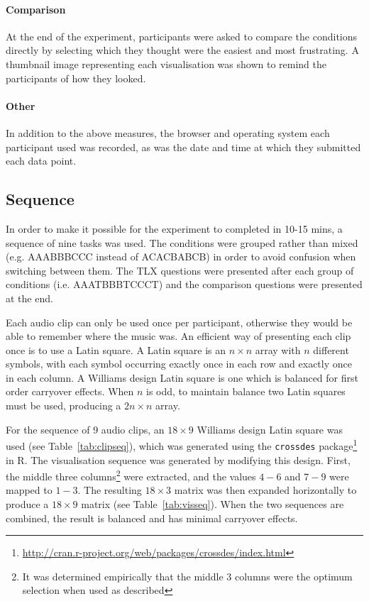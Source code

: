 \paragraph{Comparison}
At the end of the experiment, participants were asked to compare the conditions
directly by selecting which they thought were the easiest and most frustrating.
A thumbnail image representing each visualisation was shown to remind the
participants of how they looked.

\paragraph{Other}
In addition to the above measures, the browser and operating system each
participant used was recorded, as was the date and time at which they
submitted each data point.

\subsection{Sequence}\label{sec:studysequence}
In order to make it possible for the experiment to completed in 10-15 mins, a
sequence of nine tasks was used. The conditions were grouped rather than mixed
(e.g. AAABBBCCC instead of ACACBABCB) in order to avoid confusion when
switching between them. The TLX questions were presented after each group of
conditions (i.e. AAATBBBTCCCT) and the comparison questions were presented at
the end.

Each audio clip can only be used once per participant, otherwise they would be
able to remember where the music was. An efficient way of presenting each clip
once is to use a Latin square. A Latin square is an $n \times n$ array with $n$
different symbols, with each symbol occurring exactly once in each row and
exactly once in each column. A Williams design Latin square \citep{Williams1949}
is one which is balanced for first order carryover effects.  When $n$ is odd,
to maintain balance two Latin squares must be used, producing a $2n \times n$
array.

For the sequence of 9 audio clips, an $18\times9$ Williams design Latin square
was used (see Table~\ref{tab:clipseq}), which was generated using the
\texttt{crossdes}
package\footnote{\url{http://cran.r-project.org/web/packages/crossdes/index.html}}
in R. The visualisation sequence was generated by modifying this design. First,
the middle three columns\footnote{It was determined empirically that the
  middle 3 columns were the optimum selection when used as described} were
extracted, and the values $4-6$ and $7-9$ were mapped to $1-3$. The resulting
$18\times3$ matrix was then expanded horizontally to produce a $18\times9$
matrix (see Table~\ref{tab:visseq}). When the two sequences are combined, the
result is balanced and has minimal carryover effects.

